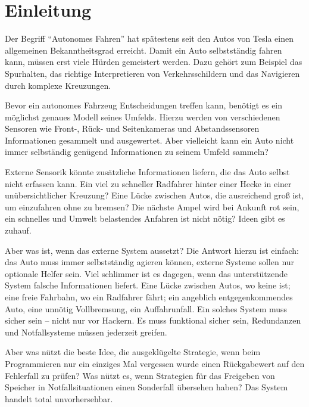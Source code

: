 
\chapter{Einleitung}

Der Begriff \enquote{Autonomes Fahren} hat spätestens seit den Autos von Tesla einen allgemeinen Bekanntheitsgrad erreicht. Damit ein Auto selbstständig fahren kann, müssen erst viele Hürden gemeistert werden.
Dazu gehört zum Beispiel das Spurhalten, das richtige Interpretieren von Verkehrsschildern und das Navigieren durch komplexe Kreuzungen.

Bevor ein autonomes Fahrzeug Entscheidungen treffen kann, benötigt es ein möglichst genaues Modell seines Umfelds.
Hierzu werden von verschiedenen Sensoren wie Front-, Rück- und Seitenkameras und Abstandssensoren Informationen gesammelt und ausgewertet.
Aber vielleicht kann ein Auto nicht immer selbständig genügend Informationen zu seinem Umfeld sammeln? %

Externe Sensorik könnte zusätzliche Informationen liefern, die das Auto selbst nicht erfassen kann.
Ein viel zu schneller Radfahrer hinter einer Hecke in einer unübersichtlicher Kreuzung?
Eine Lücke zwischen Autos, die ausreichend groß ist, um einzufahren ohne zu bremsen?
Die nächste Ampel wird bei Ankunft rot sein, ein schnelles und Umwelt belastendes Anfahren ist nicht nötig?
Ideen gibt es zuhauf.

Aber was ist, wenn das externe System aussetzt?
Die Antwort hierzu ist einfach: das Auto muss immer selbstständig agieren können, externe Systeme sollen nur optionale Helfer sein.
Viel schlimmer ist es dagegen, wenn das unterstützende System falsche Informationen liefert.
Eine Lücke zwischen Autos, wo keine ist; eine freie Fahrbahn, wo ein Radfahrer fährt; ein angeblich entgegenkommendes Auto, eine unnötig Vollbremsung, ein Auffahrunfall.
Ein solches System muss sicher sein -- nicht nur vor Hackern.
Es muss funktional sicher sein, Redundanzen und Notfallsysteme müssen jederzeit greifen.

Aber was nützt die beste Idee, die ausgeklügelte Strategie, wenn beim Programmieren nur ein einziges Mal vergessen wurde einen Rückgabewert auf den Fehlerfall zu prüfen?
Was nützt es, wenn Strategien für das Freigeben von Speicher in Notfallsituationen einen Sonderfall übersehen haben?
Das System handelt total unvorhersehbar.

